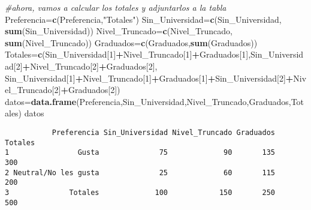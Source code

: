 \documentclass[
  a4paper,
  oneside,
  openany]{book}
\newenvironment{Shaded}{\begin{snugshade}}{\end{snugshade}}
\newcommand{\CommentTok}[1]{\textcolor[rgb]{0.56,0.35,0.01}{\textit{#1}}}
\newcommand{\DecValTok}[1]{\textcolor[rgb]{0.00,0.00,0.81}{#1}}
\newcommand{\FunctionTok}[1]{\textcolor[rgb]{0.13,0.29,0.53}{\textbf{#1}}}
\newcommand{\NormalTok}[1]{#1}
\newcommand{\OtherTok}[1]{\textcolor[rgb]{0.56,0.35,0.01}{#1}}
\newcommand{\SpecialCharTok}[1]{\textcolor[rgb]{0.81,0.36,0.00}{\textbf{#1}}}
\newcommand{\StringTok}[1]{\textcolor[rgb]{0.31,0.60,0.02}{#1}}
\begin{document}
\begin{Shaded}
\begin{Highlighting}[]
\CommentTok{\#ahora, vamos a calcular los totales y adjuntarlos a la tabla}
\NormalTok{Preferencia}\OtherTok{=}\FunctionTok{c}\NormalTok{(Preferencia,}\StringTok{"Totales"}\NormalTok{)}
\NormalTok{Sin\_Universidad}\OtherTok{=}\FunctionTok{c}\NormalTok{(Sin\_Universidad, }\FunctionTok{sum}\NormalTok{(Sin\_Universidad))}
\NormalTok{Nivel\_Truncado}\OtherTok{=}\FunctionTok{c}\NormalTok{(Nivel\_Truncado, }\FunctionTok{sum}\NormalTok{(Nivel\_Truncado))}
\NormalTok{Graduados}\OtherTok{=}\FunctionTok{c}\NormalTok{(Graduados,}\FunctionTok{sum}\NormalTok{(Graduados))}
\NormalTok{Totales}\OtherTok{=}\FunctionTok{c}\NormalTok{(Sin\_Universidad[}\DecValTok{1}\NormalTok{]}\SpecialCharTok{+}\NormalTok{Nivel\_Truncado[}\DecValTok{1}\NormalTok{]}\SpecialCharTok{+}\NormalTok{Graduados[}\DecValTok{1}\NormalTok{],Sin\_Universidad[}\DecValTok{2}\NormalTok{]}\SpecialCharTok{+}\NormalTok{Nivel\_Truncado[}\DecValTok{2}\NormalTok{]}\SpecialCharTok{+}\NormalTok{Graduados[}\DecValTok{2}\NormalTok{],}
\NormalTok{           Sin\_Universidad[}\DecValTok{1}\NormalTok{]}\SpecialCharTok{+}\NormalTok{Nivel\_Truncado[}\DecValTok{1}\NormalTok{]}\SpecialCharTok{+}\NormalTok{Graduados[}\DecValTok{1}\NormalTok{]}\SpecialCharTok{+}\NormalTok{Sin\_Universidad[}\DecValTok{2}\NormalTok{]}\SpecialCharTok{+}\NormalTok{Nivel\_Truncado[}\DecValTok{2}\NormalTok{]}\SpecialCharTok{+}\NormalTok{Graduados[}\DecValTok{2}\NormalTok{])}
\NormalTok{datos}\OtherTok{=}\FunctionTok{data.frame}\NormalTok{(Preferencia,Sin\_Universidad,Nivel\_Truncado,Graduados,Totales)}
\NormalTok{datos}
\end{Highlighting}
\end{Shaded}

\begin{verbatim}
           Preferencia Sin_Universidad Nivel_Truncado Graduados Totales
1                Gusta              75             90       135     300
2 Neutral/No les gusta              25             60       115     200
3              Totales             100            150       250     500
\end{verbatim}
\end{document}
